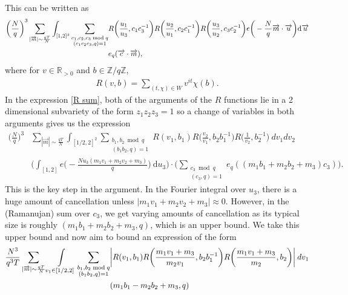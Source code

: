 \documentclass[12pt]{amsart}
\theoremstyle{definition}
\theoremstyle{plain}
\theoremstyle{remark}
\numberwithin{equation}{section}
\numberwithin{theorem}{section}
\numberwithin{equation}{section}
\begin{document}
	This can be written as 
	\begin{align}\label{R sum}
		\bigg({\frac{N}{q}}\bigg)^3\sum_{|\overrightarrow{m}| \sim \frac{qT}{N}}\int_{[1,2]^3}\sum_{\substack{c_1,c_2,c_3 \bmod{q} \\ (c_1c_2c_3,q)=1}} &R\bigg(\frac{u_1}{u_3},c_1c_3^{-1}\bigg) R\bigg(\frac{u_2}{u_1},c_2c_1^{-1}\bigg)R\bigg(\frac{u_3}{u_2} ,c_3c_2^{-1}\bigg) e\bigg(-\frac{N}{q} \overrightarrow{m}\cdot \overrightarrow{u}\bigg)\mathrm{d}\overrightarrow{u} \notag  \\
		&e_q(\overrightarrow{c} \cdot \overrightarrow{m}),  
	\end{align}
	where for $v \in \mathbb{R}_{>0}$ and $b \in \mathbb{Z}/q\mathbb{Z}$,
	\begin{align*}
		R(v,b) = \sum_{(t,\chi) \in W} v^{it} \chi(b).
	\end{align*}
	In the expression \eqref{R sum}, both of the arguments of the $R$ functions lie in a 2 dimensional subvariety of the form $z_1z_2z_3=1$ so a change of variables in both arguments gives us the expression 
	\newpage
	\begin{align*}
		\bigg(\frac{N}{q}\bigg)^3 &\sum_{|\overrightarrow{m}| \sim \frac{qT}{N}}\int_{[1/2,2]^2} \sum_{\substack{b_1,b_2 \bmod{q} \\ (b_1b_2,q)=1}} R(v_1,b_1)R\bigg(\frac{v_2}{v_1},b_2b_1^{-1}\bigg)R\bigg(\frac{1}{v_2},b_2^{-1}\bigg) \: dv_1 dv_2 \\
		&\bigg(\int_{[1,2]} e\bigg(-\frac{Nu_3(m_1v_1+m_2v_2+m_3)}{q} \bigg) \:\mathrm{d}u_3 \bigg) \cdot \bigg( \sum_{\substack{c_3 \bmod{q} \\ (c_3,q)=1}}e_q((m_1b_1+m_2b_2+m_3)c_3) \bigg).
	\end{align*}
	This is the key step in the argument. In the Fourier integral over $u_3$, there is a huge amount of cancellation unless $|m_1v_1+m_2v_2+m_3| \approx 0$. However, in the (Ramanujan) sum over $c_3$, we get varying amounts of cancellation as its typical size is roughly $(m_1b_1+m_2b_2+m_3,q)$, which is an upper bound. We take this upper bound and now aim to bound an expression of the form 
	\begin{align}\label{main Rexpression}
		\frac{N^3}{q^3T} \sum_{|\overrightarrow{m}| \sim \frac{qT}{N}} \int\limits_{\substack{v_1 \in [1/2,2]}} \sum_{\substack{b_1,b_2 \bmod q \\ (b_1b_2,q)=1}} &\bigg|R(v_1,b_1)R\bigg(\frac{m_1v_1+m_3}{m_2v_1},b_2b_1^{-1}\bigg)R\bigg(\frac{m_1v_1+m_3}{m_2},b_2\bigg)\bigg|  \: dv_1 \notag \\
		&(m_1b_1-m_2b_2+m_3,q)
	\end{align}
\end{document}
